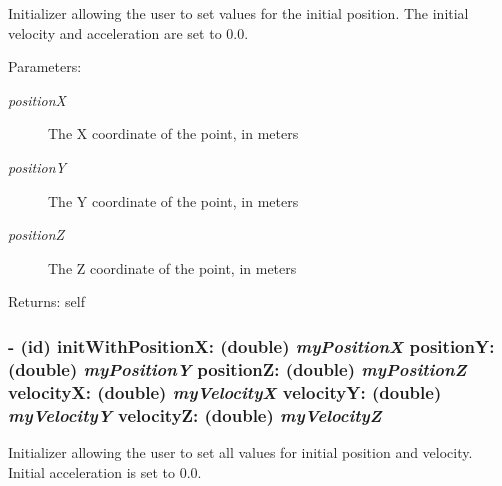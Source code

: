 Initializer allowing the user to set values for the initial position. The initial velocity and acceleration are set to 0.0.

\begin{Desc}
\item[Parameters:]
\begin{description}
\item[{\em positionX}]The X coordinate of the point, in meters \item[{\em positionY}]The Y coordinate of the point, in meters \item[{\em positionZ}]The Z coordinate of the point, in meters\end{description}
\end{Desc}
\begin{Desc}
\item[Returns:]self \end{Desc}
\hypertarget{interface_i_m_s_r_point_object_9e6718287d2f983b1e710799f70be810}{
\subsubsection[{initWithPositionX:positionY:positionZ:velocityX:velocityY:velocityZ:}]{\setlength{\rightskip}{0pt plus 5cm}- (id) initWithPositionX: (double) {\em myPositionX}\/ positionY: (double) {\em myPositionY}\/ positionZ: (double) {\em myPositionZ}\/ velocityX: (double) {\em myVelocityX}\/ velocityY: (double) {\em myVelocityY}\/ velocityZ: (double) {\em myVelocityZ}}}
\label{interface_i_m_s_r_point_object_9e6718287d2f983b1e710799f70be810}


Initializer allowing the user to set all values for initial position and velocity. Initial acceleration is set to 0.0.

